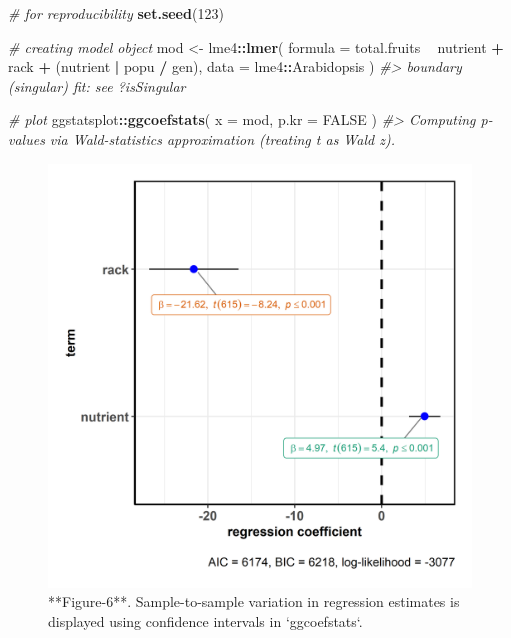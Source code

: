 \documentclass[]{article}
\newenvironment{Shaded}{\begin{snugshade}}{\end{snugshade}}
\newcommand{\CommentTok}[1]{\textcolor[rgb]{0.56,0.35,0.01}{\textit{#1}}}
\newcommand{\DataTypeTok}[1]{\textcolor[rgb]{0.13,0.29,0.53}{#1}}
\newcommand{\DecValTok}[1]{\textcolor[rgb]{0.00,0.00,0.81}{#1}}
\newcommand{\KeywordTok}[1]{\textcolor[rgb]{0.13,0.29,0.53}{\textbf{#1}}}
\newcommand{\NormalTok}[1]{#1}
\newcommand{\OperatorTok}[1]{\textcolor[rgb]{0.81,0.36,0.00}{\textbf{#1}}}
\newcommand{\OtherTok}[1]{\textcolor[rgb]{0.56,0.35,0.01}{#1}}
\newcommand{\StringTok}[1]{\textcolor[rgb]{0.31,0.60,0.02}{#1}}
\begin{document}
\begin{Shaded}
\begin{Highlighting}[]
\CommentTok{# for reproducibility}
\KeywordTok{set.seed}\NormalTok{(}\DecValTok{123}\NormalTok{)}

\CommentTok{# creating model object}
\NormalTok{mod <-}\StringTok{ }\NormalTok{lme4}\OperatorTok{::}\KeywordTok{lmer}\NormalTok{(}
  \DataTypeTok{formula =}\NormalTok{ total.fruits }\OperatorTok{~}\StringTok{ }\NormalTok{nutrient }\OperatorTok{+}\StringTok{ }\NormalTok{rack }\OperatorTok{+}\StringTok{ }\NormalTok{(nutrient }\OperatorTok{|}\StringTok{ }\NormalTok{popu }\OperatorTok{/}\StringTok{ }\NormalTok{gen),}
  \DataTypeTok{data =}\NormalTok{ lme4}\OperatorTok{::}\NormalTok{Arabidopsis}
\NormalTok{)}
\CommentTok{#> boundary (singular) fit: see ?isSingular}

\CommentTok{# plot}
\NormalTok{ggstatsplot}\OperatorTok{::}\KeywordTok{ggcoefstats}\NormalTok{(}
  \DataTypeTok{x =}\NormalTok{ mod,}
  \DataTypeTok{p.kr =} \OtherTok{FALSE}
\NormalTok{)}
\CommentTok{#> Computing p-values via Wald-statistics approximation (treating t as Wald z).}
\end{Highlighting}
\end{Shaded}

\begin{figure}
\includegraphics[width=1\linewidth]{./figures/paper-example6-1} \caption{**Figure-6**. Sample-to-sample variation in regression estimates is displayed using confidence intervals in `ggcoefstats`.}\label{fig:example6}
\end{figure}
\end{document}
